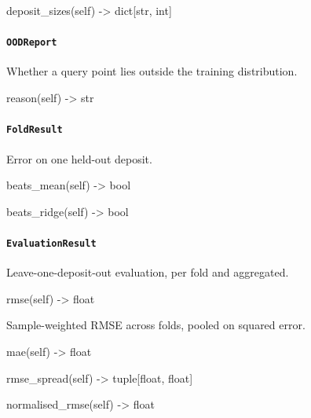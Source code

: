 \documentclass[10pt,a4paper,twoside]{report}
\begin{document}
\begin{verbatimsmall}
deposit_sizes(self) -> dict[str, int]
\end{verbatimsmall}

\paragraph{\texttt{OODReport}}

Whether a query point lies outside the training distribution.

\begin{verbatimsmall}
reason(self) -> str
\end{verbatimsmall}

\paragraph{\texttt{FoldResult}}

Error on one held-out deposit.

\begin{verbatimsmall}
beats_mean(self) -> bool
\end{verbatimsmall}

\begin{verbatimsmall}
beats_ridge(self) -> bool
\end{verbatimsmall}

\paragraph{\texttt{EvaluationResult}}

Leave-one-deposit-out evaluation, per fold and aggregated.

\begin{verbatimsmall}
rmse(self) -> float
\end{verbatimsmall}

Sample-weighted RMSE across folds, pooled on squared error.

\begin{verbatimsmall}
mae(self) -> float
\end{verbatimsmall}

\begin{verbatimsmall}
rmse_spread(self) -> tuple[float, float]
\end{verbatimsmall}

\begin{verbatimsmall}
normalised_rmse(self) -> float
\end{verbatimsmall}
\end{document}
